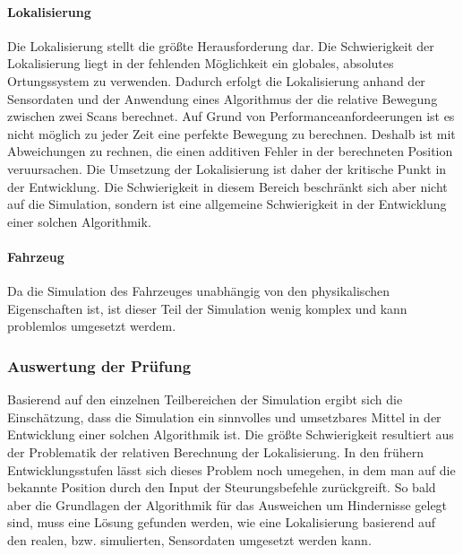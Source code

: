 \paragraph{Lokalisierung}
Die Lokalisierung stellt die größte Herausforderung dar.
Die Schwierigkeit der Lokalisierung liegt in der fehlenden Möglichkeit ein globales, absolutes Ortungssystem zu verwenden.
Dadurch erfolgt die Lokalisierung anhand der Sensordaten und der Anwendung eines Algorithmus der die relative Bewegung zwischen 
zwei Scans berechnet. 
Auf Grund von Performanceanfordeerungen ist es nicht möglich zu jeder Zeit eine perfekte Bewegung zu berechnen. 
Deshalb ist mit Abweichungen zu rechnen, die einen additiven Fehler in der berechneten Position veruursachen.
Die Umsetzung der Lokalisierung ist daher der kritische Punkt in der Entwicklung. 
Die Schwierigkeit in diesem Bereich beschränkt sich aber nicht auf die Simulation, sondern ist eine allgemeine Schwierigkeit in der Entwicklung einer solchen Algorithmik.


\paragraph{Fahrzeug}
Da die Simulation des Fahrzeuges unabhängig von den physikalischen Eigenschaften ist, ist dieser Teil der Simulation
wenig komplex und kann problemlos umgesetzt werdem. 

\subsubsection{Auswertung der Prüfung}
Basierend auf den einzelnen Teilbereichen der Simulation ergibt sich die Einschätzung, 
dass die Simulation ein sinnvolles und umsetzbares Mittel in der Entwicklung einer solchen Algorithmik ist.
Die größte Schwierigkeit resultiert aus der Problematik der relativen Berechnung der Lokalisierung. 
In den frühern Entwicklungsstufen lässt sich dieses Problem noch umegehen, in dem man auf die bekannte Position durch den 
Input der Steurungsbefehle zurückgreift. So bald aber die Grundlagen der Algorithmik für das Ausweichen um Hindernisse gelegt sind, 
muss eine Lösung gefunden werden, wie eine Lokalisierung basierend auf den realen, bzw. simulierten, Sensordaten umgesetzt werden kann.
  
\newpage
